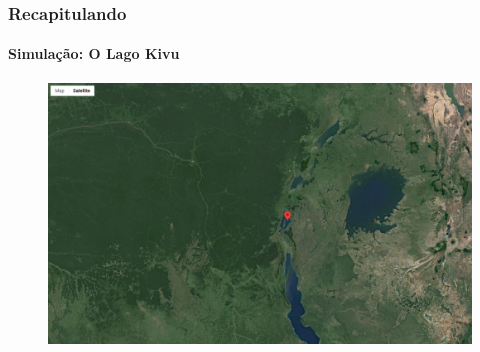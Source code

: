 \documentclass[aspectratio=169]{beamer} %
\begin{document}
{{
\begin{frame}

\frametitle{Recapitulando}
	\framesubtitle{Simulação: O Lago Kivu}
	\pause
	\begin{figure}
		\centering
		\includegraphics[scale=0.15]{images/kivu1.png}
	\end{figure}
\end{frame} 
}


{
\begin{frame}


\end{frame}}}
\end{document}

